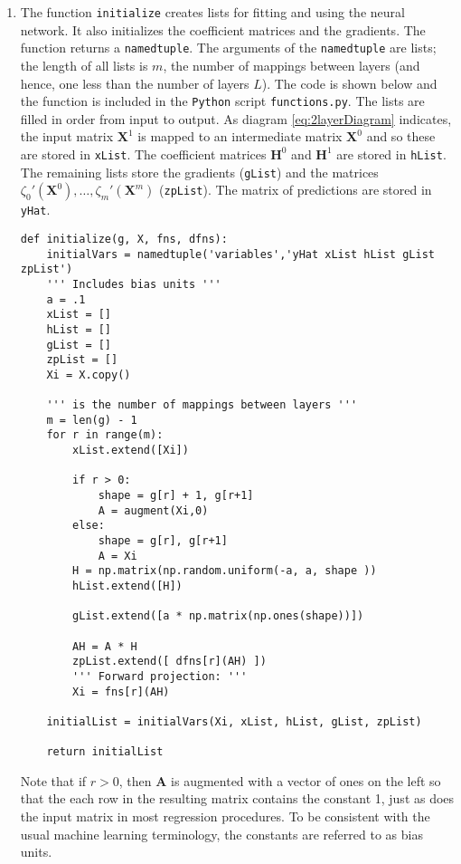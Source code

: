 \documentclass[graybox,envcountchap]{svmono}
\newcommand{\Xf}{\mathbf{X}}
\newcommand{\Hf}{\mathbf{H}}
\newcommand{\nn}{neural network}
\newcommand{\tx}{\texttt}
\begin{document}
\begin{enumerate}

\item    The function \tx{initialize} creates lists for fitting and using the {\nn }.  It also initializes the coefficient matrices and the gradients. The function returns a \tx{namedtuple}. The arguments of the \tx{namedtuple} are lists; the length of all lists is $m$, the number of mappings between layers (and hence, one less than the number of layers $L$).  The code is shown below and the function is included in the \tx{Python} script \tx{functions.py}. The lists are filled in order from input to output. As diagram \ref{eq:2layerDiagram} indicates, the input matrix $\Xf^1$ is mapped to an intermediate matrix $\Xf^0$ and so these are stored in \tx{xList}. The coefficient matrices $\Hf^0$ and $\Hf^1$ are stored in \tx{hList}. The remaining lists store the gradients (\tx{gList}) and the matrices $\zeta_0'(\Xf^0), \ldots, \zeta_m'(\Xf^m)$ (\tx{zpList}). The matrix of predictions are stored in \tx{yHat}.

\small 
\begin{svgraybox}
\begin{verbatim}
def initialize(g, X, fns, dfns):
    initialVars = namedtuple('variables','yHat xList hList gList zpList')    
    ''' Includes bias units '''
    a = .1
    xList = []
    hList = []
    gList = []
    zpList = []
    Xi = X.copy()

    ''' is the number of mappings between layers '''
    m = len(g) - 1  
    for r in range(m):
        xList.extend([Xi])
        
        if r > 0:
            shape = g[r] + 1, g[r+1]
            A = augment(Xi,0)
        else:
            shape = g[r], g[r+1]
            A = Xi
        H = np.matrix(np.random.uniform(-a, a, shape ))
        hList.extend([H])
        
        gList.extend([a * np.matrix(np.ones(shape))])
        
        AH = A * H
        zpList.extend([ dfns[r](AH) ])
        ''' Forward projection: '''
        Xi = fns[r](AH)    
    
    initialList = initialVars(Xi, xList, hList, gList, zpList)    
    
    return initialList
\end{verbatim}
\end{svgraybox}
\normalsize

Note that if $r > 0 $, then $\mathbf{A}$ is augmented with a vector of ones on the left so that the each row in the resulting matrix contains the constant 1, just as does the input matrix in most regression procedures. To be consistent with the usual machine learning terminology, the constants are referred to as bias units. 


\end{enumerate}
\end{document}
